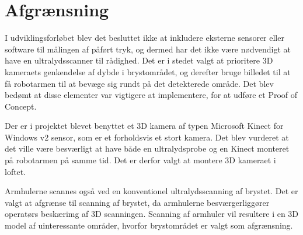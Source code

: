 \chapter{Afgrænsning}
\label{Afgransning}

I udviklingsforløbet blev det besluttet ikke at inkludere eksterne sensorer eller software til målingen af påført tryk, og dermed har det ikke være nødvendigt at have en ultralydsscanner til rådighed. Det er i stedet valgt at prioritere 3D kameraets genkendelse af dybde i brystområdet, og derefter bruge billedet til at få robotarmen til at bevæge sig rundt på det detekterede område. Det blev bedømt at disse elementer var vigtigere at implementere, for at udføre et Proof of Concept.

Der er i projektet blevet benyttet et 3D kamera af typen Microsoft Kinect for Windows v2 sensor, som er et forholdsvis et stort kamera. Det blev vurderet at det ville være besværligt at have både en ultralydsprobe og en Kinect monteret på robotarmen på samme tid. Det er derfor valgt at montere 3D kameraet i loftet. 

Armhulerne scannes også ved en konventionel ultralydsscanning af brystet. Det er valgt at afgrænse til scanning af brystet, da armhulerne besværgerliggører operatørs beskærimg af 3D scanningen. Scanning af armhuler vil resultere i en 3D model af uinteressante områder, hvorfor brystområdet er valgt som afgrænsning.  

